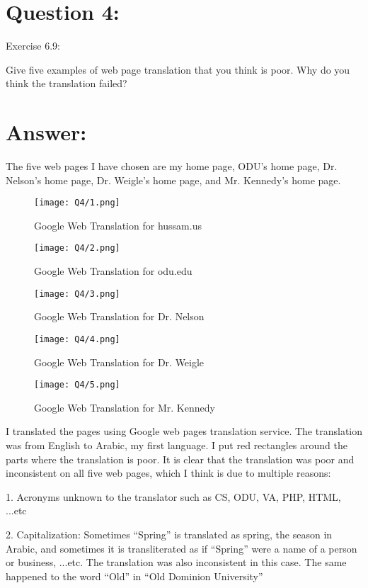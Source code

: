 \section*{Question 4:}
Exercise 6.9:

Give five examples of web page translation that you think is poor. Why do you think the translation failed?

\section*{Answer:}

The five web pages I have chosen are my home page, ODU's home page, Dr. Nelson's home page, Dr. Weigle's home page, and Mr. Kennedy's home page.

\begin{figure}[h]
\caption{Google Web Translation for hussam.us}
\centering
\texttt{[image: Q4/1.png]}
\end{figure}

\begin{figure}[h]
\caption{Google Web Translation for odu.edu}
\centering
\texttt{[image: Q4/2.png]}
\end{figure}

\begin{figure}[h]
\caption{Google Web Translation for Dr. Nelson}
\centering
\texttt{[image: Q4/3.png]}
\end{figure}

\begin{figure}[h]
\caption{Google Web Translation for Dr. Weigle}
\centering
\texttt{[image: Q4/4.png]}
\end{figure}

\begin{figure}[h]
\caption{Google Web Translation for Mr. Kennedy}
\centering
\texttt{[image: Q4/5.png]}
\end{figure}

I translated the pages using Google web pages translation service. The translation was from English to Arabic, my first language. I put red rectangles around the parts where the translation is poor. It is clear that the translation was poor and inconsistent on all five web pages, which I think is due to multiple reasons:

1. Acronyms unknown to the translator such as CS, ODU, VA, PHP, HTML, ...etc

2. Capitalization: Sometimes ``Spring'' is translated as spring, the season in Arabic, and sometimes it is transliterated as if ``Spring'' were a name of a person or business, ...etc. The translation was also inconsistent in this case. The same happened to the word ``Old'' in ``Old Dominion University''

